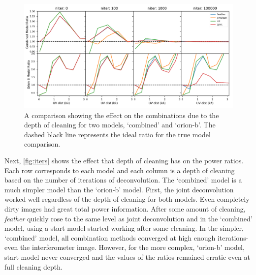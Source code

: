 \documentclass[manuscript,linenumbers]{aastex62}
\begin{document}
\begin{figure}[ht]
    \includegraphics[width=\textwidth]{figures/iter-plot}
    \caption{A comparison showing the effect on the combinations due to the depth of cleaning for two models, `combined' and `orion-b'. The dashed black line represents the ideal ratio for the true model comparison. }
    \label{fig:iters}
\end{figure}

Next, \autoref{fig:iters} shows the effect that depth of cleaning has on the power ratios. Each row corresponds to each model and each column is a depth of cleaning based on the number of iterations of deconvolution. The `combined' model is a much simpler model than the `orion-b' model. First, the joint deconvolution worked well regardless of the depth of cleaning for both models. Even completely dirty images had great total power information. After some amount of cleaning, \textit{feather} quickly rose to the same level as joint deconvolution and in the `combined' model, using a start model started working after some cleaning. In the simpler, `combined' model, all combination methods converged at high enough iterations- even the interferometer image. However, for the more complex, `orion-b' model, start model never converged and the values of the ratios remained erratic even at full cleaning depth.
\end{document}
